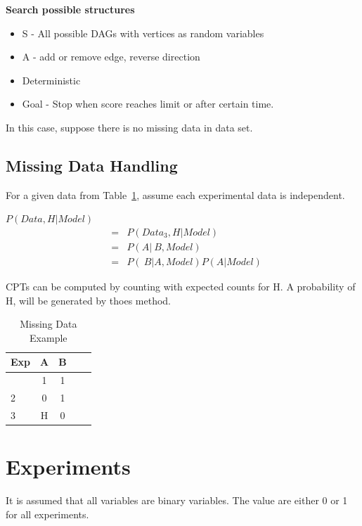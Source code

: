 \documentclass{article}
\begin{document}
\textbf{Search possible structures}
\begin{itemize}
\item S - All possible DAGs with vertices as random variables
\item A - add or remove edge, reverse direction
\item Deterministic
\item Goal - Stop when score reaches limit or after certain time.
\end{itemize}
In this case, suppose there is no missing data in data set.

\subsection{Missing Data Handling }
For a given data from Table~\ref{data}, assume each experimental data is independent.

$P(Data, H|Model)$
\begin{eqnarray}
&=&P(Data_3, H|Model)\\
&=&P(A|~B, Model)\\
&=&P(~B|A, Model)P(A|Model)
\end{eqnarray}

CPTs can be computed by counting with expected counts for H. A probability of H, will be generated by thoes method.
\begin{table}[t]
\caption{Missing Data Example} 
\label{data}
\vskip 0.15in
\begin{center}
\begin{small}
\begin{sc}
\begin{tabular}{lcccr}
\hline
\abovespace\belowspace
Exp & A & B \\
\hline
\abovespace
1    & 1 & 1& \\
2	 & 0 & 1& \\
3    & H & 0&  \\
\hline
\end{tabular}
\end{sc}
\end{small}
\end{center}
\vskip -0.1in
\end{table}


\section{Experiments}

It is assumed that all variables are binary variables. The value are either 0 or 1 for all experiments.
\end{document}
